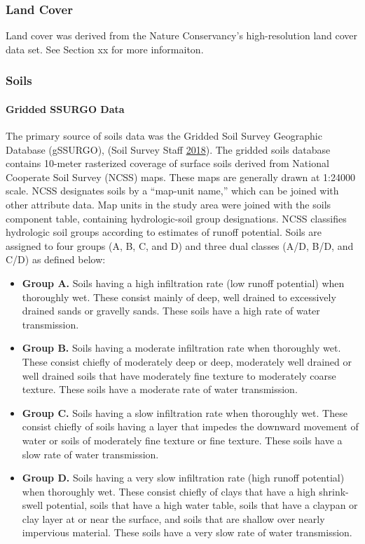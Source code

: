 \documentclass[
]{report}
\begin{document}
\hypertarget{land-cover}{%
\subsubsection{Land Cover}\label{land-cover}}

Land cover was derived from the Nature Conservancy's high-resolution land cover data set. See Section xx for more informaiton.

\hypertarget{soils}{%
\subsubsection{Soils}\label{soils}}

\hypertarget{gridded-ssurgo-data}{%
\paragraph{Gridded SSURGO Data}\label{gridded-ssurgo-data}}

The primary source of soils data was the Gridded Soil Survey Geographic Database (gSSURGO), (Soil Survey Staff \protect\hyperlink{ref-SoilSurveyStaff2018}{2018}). The gridded soils database contains 10-meter rasterized coverage of surface soils derived from National Cooperate Soil Survey (NCSS) maps. These maps are generally drawn at 1:24000 scale. NCSS designates soils by a ``map-unit name,'' which can be joined with other attribute data. Map units in the study area were joined with the soils component table, containing hydrologic-soil group designations. NCSS classifies hydrologic soil groups according to estimates of runoff potential. Soils are assigned to four groups (A, B, C, and D) and three dual classes (A/D, B/D, and C/D) as defined below:

\begin{itemize}
\item
  \textbf{Group A.} Soils having a high infiltration rate (low runoff potential) when thoroughly wet.
  These consist mainly of deep, well drained to excessively drained sands or gravelly sands.
  These soils have a high rate of water transmission.
\item
  \textbf{Group B.} Soils having a moderate infiltration rate when thoroughly wet. These consist
  chiefly of moderately deep or deep, moderately well drained or well drained soils that have
  moderately fine texture to moderately coarse texture. These soils have a moderate rate of
  water transmission.
\item
  \textbf{Group C.} Soils having a slow infiltration rate when thoroughly wet. These consist chiefly of
  soils having a layer that impedes the downward movement of water or soils of moderately
  fine texture or fine texture. These soils have a slow rate of water transmission.
\item
  \textbf{Group D.} Soils having a very slow infiltration rate (high runoff potential) when thoroughly
  wet. These consist chiefly of clays that have a high shrink-swell potential, soils that have a
  high water table, soils that have a claypan or clay layer at or near the surface, and soils that
  are shallow over nearly impervious material. These soils have a very slow rate of water
  transmission.
\end{itemize}
\end{document}
